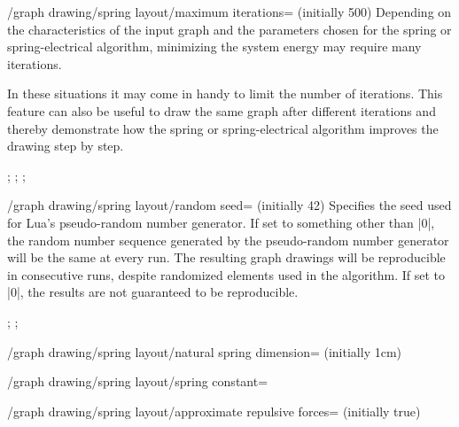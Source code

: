 \begin{key}{/graph drawing/spring layout/maximum 
  iterations= (initially 500)}
  Depending on the characteristics of the input graph and the parameters
  chosen for the spring or spring-electrical algorithm, minimizing the
  system energy may require many iterations.

  In these situations it may come in handy to limit the number of
  iterations. This feature can also be useful to draw the same graph
  after different iterations and thereby demonstrate how the spring or
  spring-electrical algorithm improves the drawing step by step.
  \begin{codeexample}[]
\tikz {};
\tikz {};
\tikz {};
  \end{codeexample}
\end{key}

\begin{key}{/graph drawing/spring layout/random seed= 
  (initially 42)}
  Specifies the seed used for Lua's pseudo-random number generator. If
  set to something other than |0|, the random number sequence generated
  by the pseudo-random number generator will be the same at every run.
  The resulting graph drawings will be reproducible in consecutive runs,
  despite randomized elements used in the algorithm.
  If set to |0|, the results are not guaranteed to be reproducible.
  \begin{codeexample}[width=5.5cm]
\tikz {};
\tikz {};
  \end{codeexample}
\end{key}

\begin{key}{/graph drawing/spring layout/natural spring
  dimension= (initially 1cm)}
\end{key}

\begin{key}{/graph drawing/spring layout/spring constant=}
\end{key}

\begin{key}{/graph drawing/spring layout/approximate repulsive
  forces= (initially true)}
\end{key}

